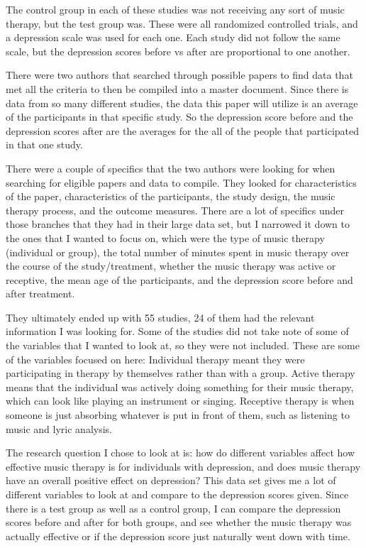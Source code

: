 \documentclass[12pt]{article}
\begin{document}
 The control group in each of these studies was not receiving any sort of music therapy, but the test group was. These were all randomized controlled trials, and a depression scale was used for each one. Each study did not follow the same scale, but the depression scores before vs after are proportional to one another. 
 
 There were two authors that searched through possible papers to find data that met all the criteria to then be compiled into a master document. Since there is data from so many different studies, the data this paper will utilize is an average of the participants in that specific study. So the depression score before and the depression scores after are the averages for the all of the people that participated in that one study. 
 
 There were a couple of specifics that the two authors were looking for when searching for eligible papers and data to compile. They looked for characteristics of the paper, characteristics of the participants, the study design, the music therapy process, and the outcome measures. There are a lot of specifics under those branches that they had in their large data set, but I narrowed it down to the ones that I wanted to focus on, which were the type of music therapy (individual or group), the total number of minutes spent in music therapy over the course of the study/treatment, whether the music therapy was active or receptive, the mean age of the participants, and the depression score before and after treatment. 
 
 They ultimately ended up with 55 studies, 24 of them had the relevant information I was looking for.  Some of the studies did not take note of some of the variables that I wanted to look at, so they were not included. These are some of the variables focused on here: Individual therapy meant they were participating in therapy by themselves rather than with a group. Active therapy means that the individual was actively doing something for their music therapy, which can look like playing an instrument or singing. Receptive therapy is when someone is just absorbing whatever is put in front of them, such as listening to music and lyric analysis. 
 
 The research question I chose to look at is: how do different variables affect how effective music therapy is for individuals with depression, and does music therapy have an overall positive effect on depression? This data set gives me a lot of different variables to look at and compare to the depression scores given. Since there is a test group as well as a control group, I can compare the depression scores before and after for both groups, and see whether the music therapy was actually effective or if the depression score just naturally went down with time.
\end{document}
